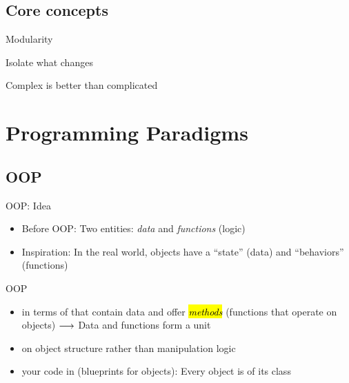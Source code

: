 \subsection{Core concepts}

\begin{frame}{Modularity}
	
\end{frame}

\begin{frame}{Isolate what changes}
	
\end{frame}

\begin{frame}{Complex is better than complicated}

\end{frame}



\section[Paradigms]{Programming Paradigms}


\subsection{OOP}


\begin{frame}{OOP: Idea}
	
	\begin{itemize}
		\item Before OOP: Two  entities: \emph{data} and \emph{functions} (logic)
		\item Inspiration: In the {real world}, {objects} have a \enquote{state} (data) and \enquote{behaviors} (functions)
	\end{itemize}	
	
	\begin{block}{OOP}
	\begin{itemize}		
		\item {} in terms of \hl{} that contain data and offer \hl{\emph{methods}} (functions that operate on objects) $\longrightarrow$ Data and functions form a unit
		\item {} on object structure rather than manipulation logic 
		\item {} your code in \hl{} (blueprints for objects): Every object is  of its class
	\end{itemize}
	\end{block}
\end{frame}

